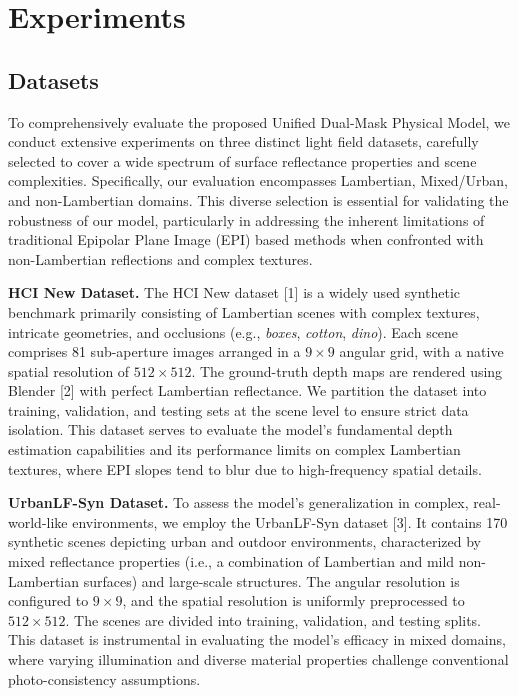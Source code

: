 \section{Experiments}

\subsection{Datasets}

To comprehensively evaluate the proposed Unified Dual-Mask Physical Model, we conduct extensive experiments on three distinct light field datasets, carefully selected to cover a wide spectrum of surface reflectance properties and scene complexities. Specifically, our evaluation encompasses Lambertian, Mixed/Urban, and non-Lambertian domains. This diverse selection is essential for validating the robustness of our model, particularly in addressing the inherent limitations of traditional Epipolar Plane Image (EPI) based methods when confronted with non-Lambertian reflections and complex textures.

\textbf{HCI New Dataset.} The HCI New dataset [1] is a widely used synthetic benchmark primarily consisting of Lambertian scenes with complex textures, intricate geometries, and occlusions (e.g., \textit{boxes}, \textit{cotton}, \textit{dino}). Each scene comprises 81 sub-aperture images arranged in a $9 \times 9$ angular grid, with a native spatial resolution of $512 \times 512$. The ground-truth depth maps are rendered using Blender [2] with perfect Lambertian reflectance. We partition the dataset into training, validation, and testing sets at the scene level to ensure strict data isolation. This dataset serves to evaluate the model's fundamental depth estimation capabilities and its performance limits on complex Lambertian textures, where EPI slopes tend to blur due to high-frequency spatial details.

\textbf{UrbanLF-Syn Dataset.} To assess the model's generalization in complex, real-world-like environments, we employ the UrbanLF-Syn dataset [3]. It contains 170 synthetic scenes depicting urban and outdoor environments, characterized by mixed reflectance properties (i.e., a combination of Lambertian and mild non-Lambertian surfaces) and large-scale structures. The angular resolution is configured to $9 \times 9$, and the spatial resolution is uniformly preprocessed to $512 \times 512$. The scenes are divided into training, validation, and testing splits. This dataset is instrumental in evaluating the model's efficacy in mixed domains, where varying illumination and diverse material properties challenge conventional photo-consistency assumptions.

